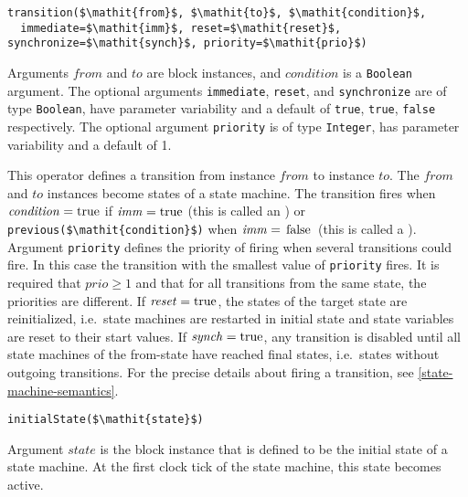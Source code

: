 \begin{operatordefinition}[transition]
\begin{synopsis}\begin{lstlisting}
transition($\mathit{from}$, $\mathit{to}$, $\mathit{condition}$,
  immediate=$\mathit{imm}$, reset=$\mathit{reset}$, synchronize=$\mathit{synch}$, priority=$\mathit{prio}$)
\end{lstlisting}\end{synopsis}
\begin{semantics}
Arguments $\mathit{from}$ and $\mathit{to}$ are block instances, and $\mathit{condition}$ is a \lstinline!Boolean! argument.
The optional arguments \lstinline!immediate!, \lstinline!reset!, and \lstinline!synchronize! are of type \lstinline!Boolean!, have parameter variability and a default of \lstinline!true!, \lstinline!true!, \lstinline!false! respectively.
The optional argument \lstinline!priority! is of type \lstinline!Integer!, has parameter variability and a default of 1.

This operator defines a transition from instance $\mathit{from}$ to instance $\mathit{to}$.
The $\mathit{from}$ and $\mathit{to}$ instances become states of a state machine.
The transition fires when $\mathit{condition} = \text{\lstinline!true!}$ if $\mathit{imm} = \text{\lstinline!true!}$ (this is called an ) or \lstinline!previous($\mathit{condition}$)! when $\mathit{imm} = \text{\lstinline!false!}$ (this is called a ).
Argument \lstinline!priority! defines the priority of firing when several transitions could fire.
In this case the transition with the smallest value of \lstinline!priority! fires.
It is required that $\mathit{prio} \geq 1$ and that for all transitions from the same state, the priorities are different. If $\mathit{reset} = \text{\lstinline!true!}$, the states of the target state are reinitialized, i.e.\ state machines are restarted in initial state and state variables are reset to their start values.
If $\mathit{synch} = \text{\lstinline!true!}$, any transition is disabled until all state machines of the from-state have reached final states, i.e.\ states without outgoing transitions.
For the precise details about firing a transition, see \cref{state-machine-semantics}.
\end{semantics}
\end{operatordefinition}

\begin{operatordefinition}[initialState]
\begin{synopsis}\begin{lstlisting}
initialState($\mathit{state}$)
\end{lstlisting}\end{synopsis}
\begin{semantics}
Argument $\mathit{state}$ is the block instance that is defined to be the initial state of a state machine.  At the first clock tick of the state machine, this state becomes active.
\end{semantics}
\end{operatordefinition}

